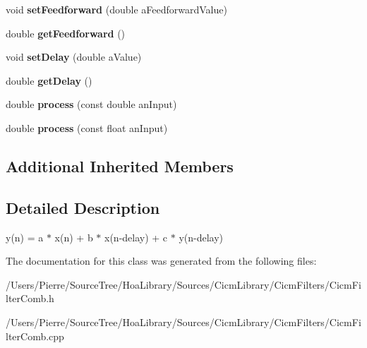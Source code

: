 \begin{DoxyCompactItemize}
\item 
\hypertarget{class_filter_comb_a414a7d1fbdc2172ea6dfce5759ea63a5}{void {\bfseries set\-Feedforward} (double a\-Feedforward\-Value)}\label{class_filter_comb_a414a7d1fbdc2172ea6dfce5759ea63a5}

\item 
\hypertarget{class_filter_comb_aa2b65087376a601550ce667d35fdd995}{double {\bfseries get\-Feedforward} ()}\label{class_filter_comb_aa2b65087376a601550ce667d35fdd995}

\item 
\hypertarget{class_filter_comb_a7e9b5eb88bfc496c2859684ee19cb1ad}{void {\bfseries set\-Delay} (double a\-Value)}\label{class_filter_comb_a7e9b5eb88bfc496c2859684ee19cb1ad}

\item 
\hypertarget{class_filter_comb_af17b0f4417bcb7e67b20e1835956966b}{double {\bfseries get\-Delay} ()}\label{class_filter_comb_af17b0f4417bcb7e67b20e1835956966b}

\item 
\hypertarget{class_filter_comb_aa40465e943220088a4736a38777402bd}{double {\bfseries process} (const double an\-Input)}\label{class_filter_comb_aa40465e943220088a4736a38777402bd}

\item 
\hypertarget{class_filter_comb_a283cb77e745ff50a72c65a7c97398421}{double {\bfseries process} (const float an\-Input)}\label{class_filter_comb_a283cb77e745ff50a72c65a7c97398421}

\end{DoxyCompactItemize}
\subsection*{Additional Inherited Members}


\subsection{Detailed Description}
y(n) = a $\ast$ x(n) + b $\ast$ x(n-\/delay) + c $\ast$ y(n-\/delay) 

The documentation for this class was generated from the following files\-:\begin{DoxyCompactItemize}
\item 
/\-Users/\-Pierre/\-Source\-Tree/\-Hoa\-Library/\-Sources/\-Cicm\-Library/\-Cicm\-Filters/Cicm\-Filter\-Comb.\-h\item 
/\-Users/\-Pierre/\-Source\-Tree/\-Hoa\-Library/\-Sources/\-Cicm\-Library/\-Cicm\-Filters/Cicm\-Filter\-Comb.\-cpp\end{DoxyCompactItemize}
